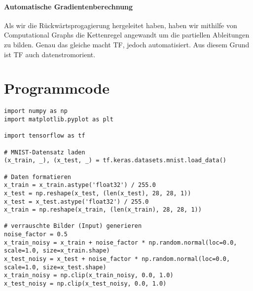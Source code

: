 \begin{appendices}
\subsubsection*{Automatische Gradientenberechnung}
Als wir die Rückwärtsprogagierung hergeleitet haben, haben wir mithilfe von
Computational Graphs die Kettenregel angewandt um die partiellen Ableitungen zu
bilden. Genau das gleiche macht TF, jedoch automatisiert. Aus diesem Grund ist
TF auch datenstromorient.



\chapter{Programmcode}

\begin{verbatim}
import numpy as np
import matplotlib.pyplot as plt

import tensorflow as tf

# MNIST-Datensatz laden
(x_train, _), (x_test, _) = tf.keras.datasets.mnist.load_data()

# Daten formatieren
x_train = x_train.astype('float32') / 255.0
x_test = np.reshape(x_test, (len(x_test), 28, 28, 1))
x_test = x_test.astype('float32') / 255.0
x_train = np.reshape(x_train, (len(x_train), 28, 28, 1))

# verrauschte Bilder (Input) generieren
noise_factor = 0.5
x_train_noisy = x_train + noise_factor * np.random.normal(loc=0.0, scale=1.0, size=x_train.shape)
x_test_noisy = x_test + noise_factor * np.random.normal(loc=0.0, scale=1.0, size=x_test.shape)
x_train_noisy = np.clip(x_train_noisy, 0.0, 1.0)
x_test_noisy = np.clip(x_test_noisy, 0.0, 1.0)


\end{verbatim}
\end{appendices}
